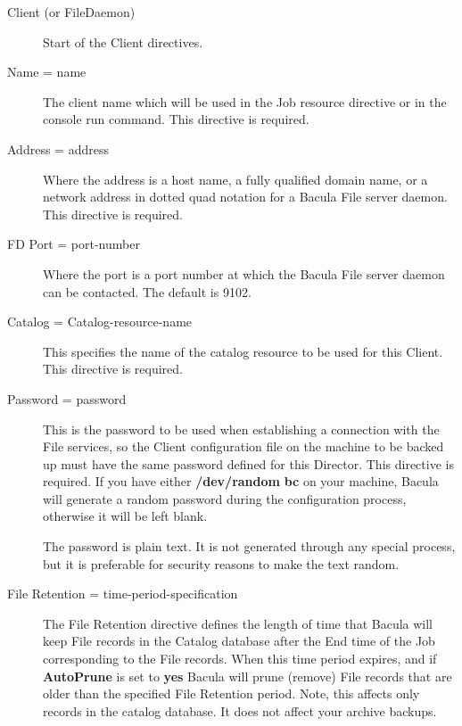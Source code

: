 \begin{description}

\item [Client (or FileDaemon)]
   Start of the Client directives.  

\item [Name = \lt{}name\gt{}]
   The client name which will be used in the  Job resource directive or in the
console run command.  This directive is required.  

\item [Address = \lt{}address\gt{}]
   Where the address is a host name, a fully qualified domain name, or a
   network address in dotted quad notation for a Bacula File server daemon.
   This directive is required.

\item [FD Port = \lt{}port-number\gt{}]
   Where the port is a port  number at which the Bacula File server daemon can
   be contacted.  The default is 9102. 

\item [Catalog = \lt{}Catalog-resource-name\gt{}]
   This specifies the  name of the catalog resource to be used for this Client. 
   This directive is required.  

\item [Password = \lt{}password\gt{}]
   This is the password to be  used when establishing a connection with the File
   services, so  the Client configuration file on the machine to be backed up
   must  have the same password defined for this Director. This directive is 
   required.  If you have either {\bf /dev/random}  {\bf bc} on your machine,
   Bacula will generate a random  password during the configuration process,
   otherwise it will  be left blank. 

   The password is plain text.  It is not generated through any special
   process, but it is preferable for security reasons to make the text
   random.

\label{FileRetention}
\item [File Retention = \lt{}time-period-specification\gt{}]
   \label{FileRetention}
   The File Retention directive defines the length of time that  Bacula will
   keep File records in the Catalog database after the End time of the
   Job corresponding to the File records.
   When this time period expires, and if
   {\bf AutoPrune} is set to  {\bf yes} Bacula will prune (remove) File records
   that  are older than the specified File Retention period. Note, this  affects
   only records in the catalog database. It does not  affect your archive
   backups.  


\end{description}
